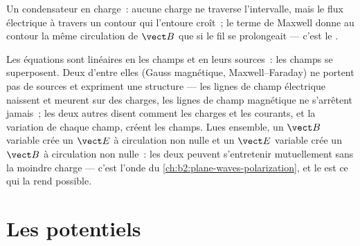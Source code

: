 \begin{omfigure}

{\small Un condensateur en charge~: aucune charge ne traverse l'intervalle, mais le
flux électrique à travers un contour qui l'entoure croît~; le terme de Maxwell donne au
contour la même circulation de $\vect B$ que si le fil se prolongeait --- c'est le
.}
\end{omfigure}

\begin{remark}\label{rem:b2:maxwell-equations:linearity}
Les équations sont linéaires en les champs et en leurs sources~: les champs
se superposent. Deux d'entre elles (Gauss magnétique, Maxwell--Faraday) ne portent pas de sources et
expriment une structure --- les lignes de champ électrique naissent et meurent sur des charges,
les lignes de champ magnétique ne s'arrêtent jamais~; les deux autres disent comment les charges et
les courants, et la variation de chaque champ, créent les champs. Lues
ensemble, un $\vect B$ variable crée un $\vect E$ à circulation non nulle et un $\vect E$ variable
crée un $\vect B$ à circulation non nulle~: les deux peuvent s'entretenir mutuellement sans
la moindre charge --- c'est l'onde du
\cref{ch:b2:plane-waves-polarization}, et le  est
ce qui la rend possible.
\end{remark}

\section{Les potentiels}

